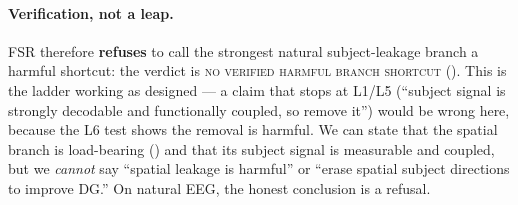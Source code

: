 \paragraph{Verification, not a leap.} FSR therefore \textbf{refuses} to call the strongest natural subject-leakage
branch a harmful shortcut: the verdict is \textsc{no verified harmful branch shortcut}
(). This is the ladder working as designed --- a claim that stops at L1/L5 (``subject signal is
strongly decodable and functionally coupled, so remove it'') would be wrong here, because the L6 test shows the
removal is harmful. We can state that the spatial branch is load-bearing () and that its subject signal
is measurable and coupled, but we \emph{cannot} say ``spatial leakage is harmful'' or ``erase spatial subject
directions to improve DG.'' On natural EEG, the honest conclusion is a refusal.
